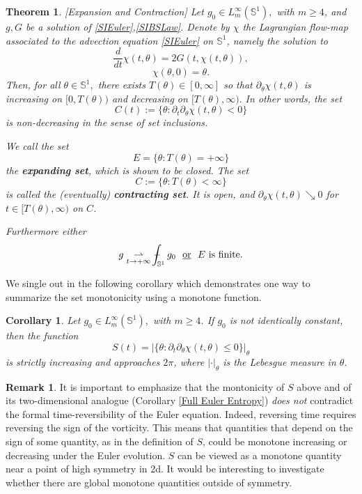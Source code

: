 \documentclass[10pt]{article}
\numberwithin{equation}{section}
\theoremstyle{plain}
\newtheorem{theorem}{Theorem}
\newtheorem{corollary}[lemma]{Corollary}
\theoremstyle{definition}
\newtheorem{remark}[lemma]{Remark}
\def\Xint#1{\mathchoice
{\XXint\displaystyle\textstyle{#1}}%
{\XXint\textstyle\scriptstyle{#1}}%
{\XXint\scriptstyle\scriptscriptstyle{#1}}%
{\XXint\scriptscriptstyle\scriptscriptstyle{#1}}%
\!\int}
\def\XXint#1#2#3{{\setbox0=\hbox{$#1{#2#3}{\int}$ }
\vcenter{\hbox{$#2#3$ }}\kern-.6\wd0}}
\def\dashint{\Xint-}
\numberwithin{equation}{section}
\begin{document}
\begin{theorem}\label{thm:expanding-sets}[Expansion and Contraction]
Let $g_0\in L^\infty_m(\mathbb{S}^1),$ with $m \geq 4$, and $g,G$ be a solution of \eqref{SIEuler},\eqref{SIBSLaw}. Denote by $\chi$ the Lagrangian flow-map associated to the advection equation \eqref{SIEuler} on $\mathbb{S}^1$, namely the solution to
\[\frac{d}{dt}\chi(t,\theta)=2G(t,\chi(t,\theta)),\]
\[\chi(\theta,0)=\theta.\]
Then, for all $\theta\in \mathbb{S}^1,$ there exists $T(\theta)\in [0,\infty]$ so that $\partial_\theta\chi(t,\theta)$ is increasing on $[0,T(\theta))$ and decreasing on $[T(\theta),\infty).$ In other words, the set
\[
C(t) := \{\theta :  \partial_t\partial_\theta \chi(t,\theta) < 0\}
\]
is non-decreasing in the sense of set inclusions.

\medskip

\noindent We call the set \[E=\{\theta: T(\theta)=+\infty\}%
\] the \textbf{expanding set}, which is shown to be closed. The set \[C:=\{\theta: T(\theta)<\infty\}\] is called the (eventually) \textbf{contracting set}. It is open, and $\partial_\theta\chi(t,\theta)\searrow 0$ for $t\in [T(\theta), \infty)$ on $C$.

\noindent Furthermore either
\[
g \underset{t\rightarrow+\infty}{\rightharpoonup} \dashint_{\mathbb{S}^1}g_0  \ \text{ \underline{or} } \ E \text{ is finite}.
\]
\end{theorem}

We single out in the following corollary which demonstrates one way to summarize the set monotonicity using a monotone function.
\begin{corollary}\label{entropy 0-hom Euler} 
Let $g_0\in L_m^\infty(\mathbb{S}^1),$ with $m \geq 4$. If $g_0$ is not identically constant, then the function  
\[
S(t)=\left|\{\theta :  \partial_t\partial_\theta \chi(t,\theta) \leq 0\}\right|_{\theta}
\]
is strictly increasing and approaches $2\pi$, where $\left|\cdot \right|_{\theta}$ is the Lebesgue measure in $\theta$.
\end{corollary}
\begin{remark}
It is important to emphasize that the montonicity of $S$ above and of its two-dimensional analogue (Corollary \ref{Full Euler Entropy}) \emph{does not} contradict the formal time-reversibility of the Euler equation. Indeed, reversing time requires reversing the sign of the vorticity. This means that quantities that depend on the sign of some quantity, as in the definition of $S$, could be monotone increasing or decreasing under the Euler evolution. $S$ can be viewed as a monotone quantity near a point of high symmetry in 2d. It would be interesting to investigate whether there are global monotone quantities outside of symmetry.   
\end{remark}
\end{document}
